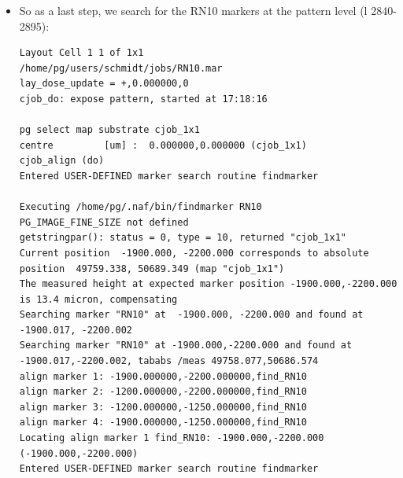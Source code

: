 \begin{itemize}
\begin{lstlisting}
Executing /home/pg/.naf/bin/findmarker RN20
PG_IMAGE_FINE_SIZE not defined
getstringpar(): status = 0, type = 10, returned "cjob_shapingARP"
Current position  -3500.000, -8100.000 corresponds to absolute position  48167.324, 44786.885 (map "cjob_shapingARP")
The measured height at expected marker position -3500.000,-8100.000 is 16.1 micron, compensating
Searching marker "RN20" at  -3500.000, -8100.000 and found at  -3499.889, -8099.631
Searching marker "RN20" at -3500.000,-8100.000 and found at -3499.889,-8099.631, tababs /meas 48165.902,44784.120
found @ -3499.941,-1899.714 (absolute: 48158.966,50987.229)
Locating align marker 4 find_RN20: -3500.000,-8100.000  (-3500.000,-8100.000)
found @ -3499.889,-8099.631 (absolute: 48167.435,44787.254)
\end{lstlisting}

Obviously, the first alignment on the exposure level was already quite good, since we now already have alignment precision to our marker positions on the sub-micron level. This is probably good enough for most people, but definitely not if you require very precise feature alignment (in this case precision below \SI{100}{\nano\meter})

\item So as a last step, we search for the RN10 markers at the pattern level (l 2840-2895):
\begin{lstlisting}
Layout Cell 1 1 of 1x1
/home/pg/users/schmidt/jobs/RN10.mar
lay_dose_update = +,0.000000,0
cjob_do: expose pattern, started at 17:18:16

pg select map substrate cjob_1x1
centre         [um] :  0.000000,0.000000 (cjob_1x1)
cjob_align (do)
Entered USER-DEFINED marker search routine findmarker

Executing /home/pg/.naf/bin/findmarker RN10
PG_IMAGE_FINE_SIZE not defined
getstringpar(): status = 0, type = 10, returned "cjob_1x1"
Current position  -1900.000, -2200.000 corresponds to absolute position  49759.338, 50689.349 (map "cjob_1x1")
The measured height at expected marker position -1900.000,-2200.000 is 13.4 micron, compensating
Searching marker "RN10" at  -1900.000, -2200.000 and found at  -1900.017, -2200.002
Searching marker "RN10" at -1900.000,-2200.000 and found at -1900.017,-2200.002, tababs /meas 49758.077,50686.574
align marker 1: -1900.000000,-2200.000000,find_RN10
align marker 2: -1200.000000,-2200.000000,find_RN10
align marker 3: -1200.000000,-1250.000000,find_RN10
align marker 4: -1900.000000,-1250.000000,find_RN10
Locating align marker 1 find_RN10: -1900.000,-2200.000  (-1900.000,-2200.000)
Entered USER-DEFINED marker search routine findmarker


\end{lstlisting}
\end{itemize}
